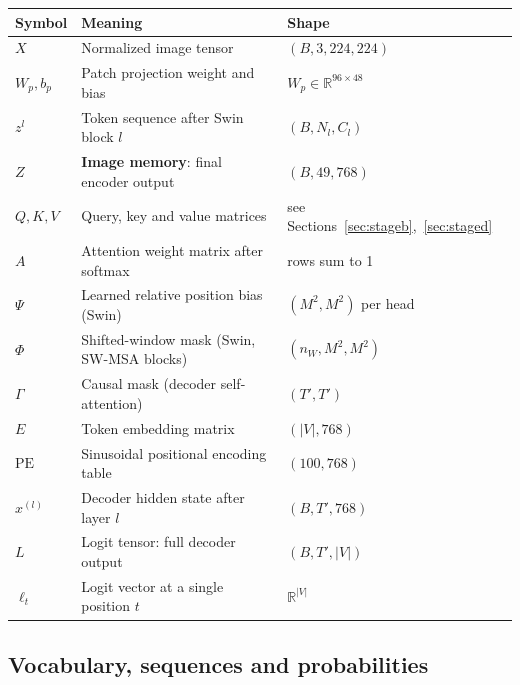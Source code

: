 \documentclass[12pt]{article}
\begin{document}
\begin{center}
\begin{tabular}{@{}lL{7cm}l@{}}
\toprule
Symbol & Meaning & Shape \\
\midrule
$X$ & Normalized image tensor & $(B, 3, 224, 224)$ \\
$W_p, b_p$ & Patch projection weight and bias & $W_p \in \mathbb{R}^{96\times48}$ \\
$z^l$ & Token sequence after Swin block $l$ & $(B, N_l, C_l)$ \\
$Z$ & \textbf{Image memory}: final encoder output & $(B, 49, 768)$ \\
$Q, K, V$ & Query, key and value matrices & see Sections~\ref{sec:stageb},~\ref{sec:staged} \\
$A$ & Attention weight matrix after softmax & rows sum to 1 \\
$\Psi$ & Learned relative position bias (Swin) & $(M^2, M^2)$ per head \\
$\Phi$ & Shifted-window mask (Swin, SW-MSA blocks) & $(n_W, M^2, M^2)$ \\
$\Gamma$ & Causal mask (decoder self-attention) & $(T', T')$ \\
$E$ & Token embedding matrix & $(|V|, 768)$ \\
$\mathrm{PE}$ & Sinusoidal positional encoding table & $(100, 768)$ \\
$x^{(l)}$ & Decoder hidden state after layer $l$ & $(B, T', 768)$ \\
$L$ & Logit tensor: full decoder output & $(B, T', |V|)$ \\
$\ell_t$ & Logit vector at a single position $t$ & $\mathbb{R}^{|V|}$ \\
\bottomrule
\end{tabular}
\end{center}

\subsection{Vocabulary, sequences and probabilities}
\end{document}
